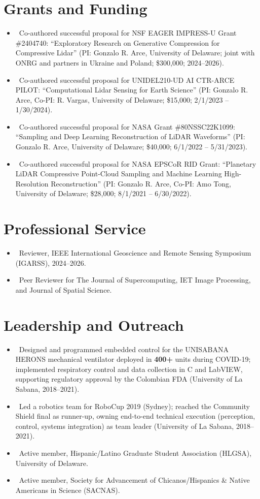 \documentclass[letterpaper,10pt]{article}
\newcommand{\resumeItem}[1]{\item\small{#1}}
\newcommand{\resumeSubHeadingList}{\begin{itemize}[leftmargin=0.15in, label={}]}
\newcommand{\resumeSubHeadingListEnd}{\end{itemize}}
\begin{document}
\section{Grants and Funding}
\resumeSubHeadingList
  \resumeItem{\textbullet\ Co-authored successful proposal for NSF EAGER IMPRESS-U Grant \#2404740: ``Exploratory Research on Generative Compression for Compressive Lidar'' (PI: Gonzalo R. Arce, University of Delaware; joint with ONRG and partners in Ukraine and Poland; \$300,000; 2024--2026).}
  \resumeItem{\textbullet\ Co-authored successful proposal for UNIDEL210-UD AI CTR-ARCE PILOT: ``Computational Lidar Sensing for Earth Science'' (PI: Gonzalo R. Arce, Co-PI: R. Vargas, University of Delaware; \$15,000; 2/1/2023 -- 1/30/2024).}
  \resumeItem{\textbullet\ Co-authored successful proposal for NASA Grant \#80NSSC22K1099: ``Sampling and Deep Learning Reconstruction of LiDAR Waveforms'' (PI: Gonzalo R. Arce, University of Delaware; \$40,000; 6/1/2022 -- 5/31/2023).}
  \resumeItem{\textbullet\ Co-authored successful proposal for NASA EPSCoR RID Grant: ``Planetary LiDAR Compressive Point-Cloud Sampling and Machine Learning High-Resolution Reconstruction'' (PI: Gonzalo R. Arce, Co-PI: Amo Tong, University of Delaware; \$28,000; 8/1/2021 -- 6/30/2022).}
\resumeSubHeadingListEnd

\section{Professional Service}
\resumeSubHeadingList
  \resumeItem{\textbullet\ Reviewer, IEEE International Geoscience and Remote Sensing Symposium (IGARSS), 2024--2026.}
  \resumeItem{\textbullet\ Peer Reviewer for The Journal of Supercomputing, IET Image Processing, and Journal of Spatial Science.}
\resumeSubHeadingListEnd

\section{Leadership and Outreach}
\resumeSubHeadingList
  \resumeItem{\textbullet\ Designed and programmed embedded control for the UNISABANA HERONS mechanical ventilator deployed in \textbf{400+} units during COVID-19; implemented respiratory control and data collection in C and LabVIEW, supporting regulatory approval by the Colombian FDA (University of La Sabana, 2018--2021).}
  \resumeItem{\textbullet\ Led a robotics team for RoboCup 2019 (Sydney); reached the Community Shield final as runner-up, owning end-to-end technical execution (perception, control, systems integration) as team leader (University of La Sabana, 2018--2021).}
  \resumeItem{\textbullet\ Active member, Hispanic/Latino Graduate Student Association (HLGSA), University of Delaware.}
  \resumeItem{\textbullet\ Active member, Society for Advancement of Chicanos/Hispanics \& Native Americans in Science (SACNAS).}
\resumeSubHeadingListEnd
\end{document}
